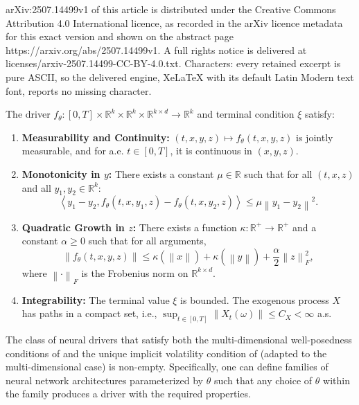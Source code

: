 \documentclass[10pt,a4paper]{amsart}
\newcommand{\R}{\mathbb{R}}
\newcommand{\norm}[1]{\left\lVert#1\right\rVert}
\newcommand{\scpr}[2]{\left\langle #1, #2 \right\rangle}
\begin{document}
arXiv:2507.14499v1 of this article is distributed under the Creative Commons Attribution 4.0 International licence, as recorded in the arXiv licence metadata for this exact version and shown on the abstract page https://arxiv.org/abs/2507.14499v1. A full rights notice is delivered at licenses/arxiv-2507.14499-CC-BY-4.0.txt. Characters: every retained excerpt is pure ASCII, so the delivered engine, XeLaTeX with its default Latin Modern text font, reports no missing character.
\begin{assumption}
\label{ass:wellposedness_multidim}
The driver $f_\theta: [0,T] \times \R^k \times \R^k \times \R^{k \times d} \to \R^k$ and terminal condition $\xi$ satisfy:
\begin{enumerate}[label=(\roman*)]
    \item \textbf{Measurability and Continuity:} $(t,x,y,z) \mapsto f_\theta(t,x,y,z)$ is jointly measurable, and for a.e. $t \in [0,T]$, it is continuous in $(x,y,z)$.
    \item \textbf{Monotonicity in $y$:} There exists a constant $\mu \in \R$ such that for all $(t,x,z)$ and all $y_1, y_2 \in \R^k$:
    \[ \scpr{y_1 - y_2}{f_\theta(t,x,y_1,z) - f_\theta(t,x,y_2,z)} \le \mu \norm{y_1 - y_2}^2. \]
    \item \textbf{Quadratic Growth in $z$:} There exists a function $\kappa: \R^+ \to \R^+$ and a constant $\alpha \ge 0$ such that for all arguments,
    \[ \norm{f_\theta(t,x,y,z)} \le \kappa(\norm{x}) + \kappa(\norm{y}) + \frac{\alpha}{2}\norm{z}_F^2, \]
    where $\norm{\cdot}_F$ is the Frobenius norm on $\R^{k \times d}$.
    \item \textbf{Integrability:} The terminal value $\xi$ is bounded. The exogenous process $X$ has paths in a compact set, i.e., $\sup_{t \in [0,T]} \norm{X_t(\omega)} \le C_X < \infty$ a.s.
\end{enumerate}
\end{assumption}

\begin{theorem}
\label{thm:existence_of_theta}
The class of neural drivers that satisfy both the multi-dimensional well-posedness conditions of  and the unique implicit volatility condition of  (adapted to the multi-dimensional case) is non-empty. Specifically, one can define families of neural network architectures parameterized by $\theta$ such that any choice of $\theta$ within the family produces a driver with the required properties.
\end{theorem}
\end{document}
